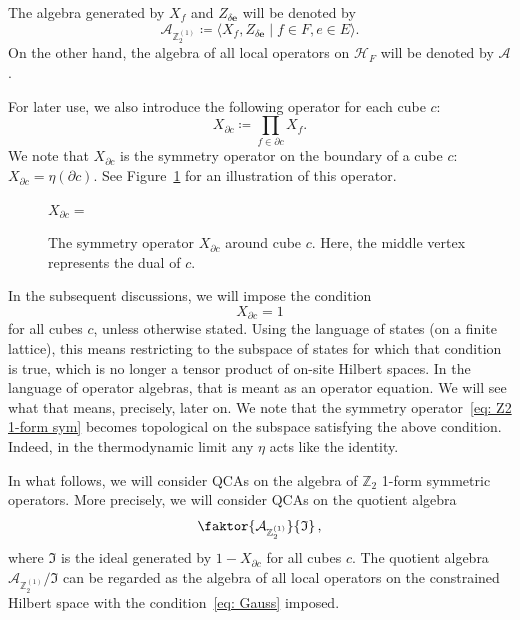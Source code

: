 \documentclass[aps,twocolumn,prx,floatfix,preprintnumbers, nofootinbib,10pt]{revtex4-2}
\numberwithin{equation}{section}
\theoremstyle{definition}
\theoremstyle{remark}
\theoremstyle{claim}
\newcommand{\be}{\begin{equation}}
\newcommand{\ee}{\end{equation}}
\begin{document}
The algebra generated by $X_f$ and $Z_{\delta \bm{e}}$ will be denoted by
\begin{equation}
\mathcal{A}_{\mathbb{Z}_2^{(1)}} \coloneq \langle X_f, Z_{\delta \bm{e}} \mid f \in F, e \in E \rangle.
\end{equation}
On the other hand, the algebra of all local operators on $\mathcal{H}_F$ will be denoted by $\mathcal{A}$.

For later use, we also introduce the following operator for each cube $c$:
\begin{equation}
X_{\partial c} \coloneq \prod_{f \in \partial c} X_f.
\end{equation}
We note that $X_{\partial c}$ is the symmetry operator on the boundary of a cube $c$: $X_{\partial c} = \eta(\partial c)$.
See Figure~\ref{fig: X partial c} for an illustration of this operator.
\begin{figure}
\centering
$X_{\partial c} =$
\caption{The symmetry operator $X_{\partial c}$ around cube $c$. Here, the middle vertex represents the dual of $c$.}
\label{fig: X partial c}
\end{figure}
In the subsequent discussions, we will impose the condition
\begin{equation}
X_{\partial c} = 1
\label{eq: Gauss}
\end{equation}
for all cubes $c$, unless otherwise stated.
Using the language of states (on a finite lattice), this means restricting to the subspace of states for which that condition is true, which is no longer a tensor product of on-site Hilbert spaces. In the language of operator algebras, that is meant as an operator equation. We will see what that means, precisely, later on.
We note that the symmetry operator~\eqref{eq: Z2 1-form sym} becomes topological on the subspace satisfying the above condition. Indeed, in the thermodynamic limit any $\eta$ acts like the identity.

In what follows, we will consider QCAs on the algebra of $\mathbb{Z}_2$ 1-form symmetric operators.
More precisely, we will consider QCAs on the quotient algebra
\be 
\faktor{\mathcal{A}_{\mathbb{Z}_2^{(1)}}}{\mathfrak{I}} \,,
\ee 
where $\mathfrak{I}$ is the ideal generated by $1 - X_{\partial c}$ for all cubes $c$. 
The quotient algebra $\mathcal{A}_{\mathbb{Z}_2^{(1)}} / \mathfrak{I}$ can be regarded as the algebra of all local operators on the constrained Hilbert space with the condition~\eqref{eq: Gauss} imposed.
\end{document}
